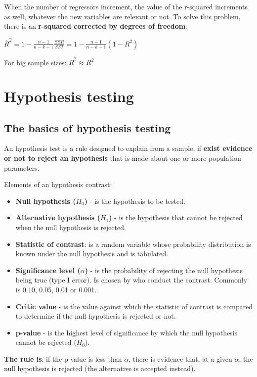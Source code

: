 \documentclass[10pt, a4paper, landscape]{extarticle}
\begin{document}
\begin{multicols}{3}
When the number of regressors increment, the value of the r-squared increments as well, whatever the new variables are relevant or not. To solve this problem, there is an \textbf{r-squared corrected by degrees of freedom}:

\begin{center}
$\overline{R}^2 = 1 - \frac{n-1}{n-k-1} \frac{SSR}{SST} = 1 - \frac{n-1}{n-k-1} (1-R^2)$
\end{center}

For big sample sizes: $\overline{R}^2 \approx R^2$

\section*{Hypothesis testing}
\subsection*{The basics of hypothesis testing}

An hypothesis test is a rule designed to explain from a sample, if \textbf{exist evidence or not to reject an hypothesis} that is made about one or more population parameters.

Elements of an hypothesis contrast:

\begin{itemize}[leftmargin=*]
\item \textbf{Null hypothesis ($H_0$)} - is the hypothesis to be tested.
\item \textbf{Alternative hypothesis ($H_1$)} - is the hypothesis that cannot be rejected when the null hypothesis is rejected.
\item \textbf{Statistic of contrast}: is a random variable whose probability distribution is known under the null hypothesis and is tabulated.
\item \textbf{Significance level ($\alpha$)} - is the probability of rejecting the null hypothesis being true (type I error). Is chosen by who conduct the contrast. Commonly is 0.10, 0.05, 0.01 or 0.001.
\item \textbf{Critic value} - is the value against which
the statistic of contrast is compared to determine if the
null hypothesis is rejected or not.
\item \textbf{p-value} - is the highest level of significance by which the null hypothesis cannot be rejected ($H_0$).
\end{itemize}

\textbf{The rule is}: if the p-value is less than $\alpha$, there is evidence that, at a given $\alpha$, the null hypothesis is rejected (the alternative is accepted instead).


\end{multicols}
\end{document}
